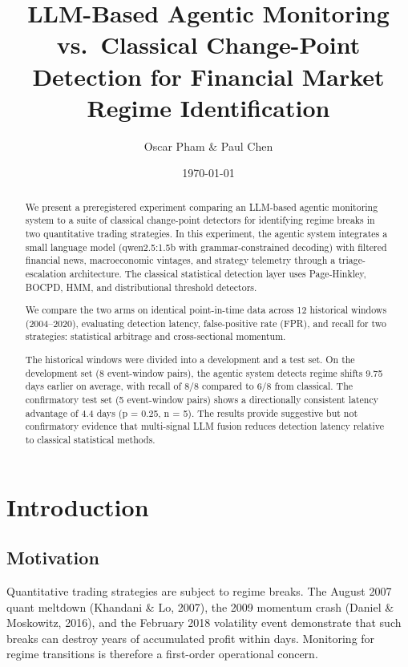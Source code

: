 \documentclass[11pt,a4paper]{article}
\title{LLM-Based Agentic Monitoring vs.\ Classical Change-Point Detection for
Financial Market Regime Identification}
\author{Oscar Pham \& Paul Chen}
\date{\today}
\begin{document}
\maketitle

\begin{abstract}
We present a preregistered experiment comparing an LLM-based agentic monitoring system to a suite of classical change-point detectors for identifying regime breaks in two quantitative trading strategies. In this experiment, the agentic system integrates a small language model (qwen2.5:1.5b with grammar-constrained decoding) with filtered financial news, macroeconomic vintages, and strategy telemetry through a triage-escalation architecture. The classical statistical detection layer uses Page-Hinkley, BOCPD, HMM, and distributional threshold detectors.

We compare the two arms on identical point-in-time data across 12 historical windows (2004--2020), evaluating detection latency, false-positive rate (FPR), and recall for two strategies: statistical arbitrage and cross-sectional momentum.

The historical windows were divided into a development and a test set. On the development set (8 event-window pairs), the agentic system detects regime shifts 9.75 days earlier on average, with recall of 8/8 compared to 6/8 from classical. The confirmatory test set (5 event-window pairs) shows a directionally consistent latency advantage of 4.4 days (p = 0.25, n = 5). The results provide suggestive but not confirmatory evidence that multi-signal LLM fusion reduces detection latency relative to classical statistical methods.
\end{abstract}
\section{Introduction}\label{sec:intro}

\subsection{Motivation}\label{sec:motivation}

Quantitative trading strategies are subject to regime breaks. The August 2007 quant meltdown (Khandani \& Lo, 2007), the 2009 momentum crash (Daniel \& Moskowitz, 2016), and the February 2018 volatility event demonstrate that such breaks can destroy years of accumulated profit within days. Monitoring for regime transitions is therefore a first-order operational concern.
\end{document}
